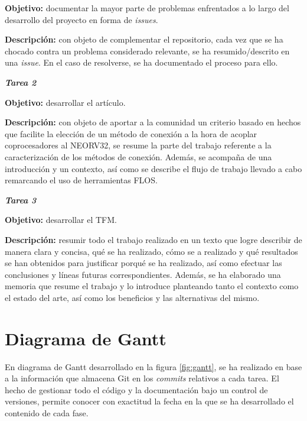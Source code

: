 \textbf{Objetivo:} documentar la mayor parte de problemas enfrentados a lo largo del desarrollo del proyecto en forma de \textit{issues}.

\textbf{Descripción:} con objeto de complementar el repositorio, cada vez que se ha chocado contra un problema considerado relevante, se ha resumido/descrito en una \textit{issue}.
En el caso de resolverse, se ha documentado el proceso para ello.

\noindent \textbf{\textit{Tarea 2}}

\textbf{Objetivo:} desarrollar el artículo.

\textbf{Descripción:} con objeto de aportar a la comunidad un criterio basado en hechos que facilite la elección de un método de conexión a la hora de acoplar coprocesadores al NEORV32, se resume la parte del trabajo referente a la caracterización de los métodos de conexión. 
Además, se acompaña de una introducción y un contexto, así como se describe el flujo de trabajo llevado a cabo remarcando el uso de herramientas FLOS.

\noindent \textbf{\textit{Tarea 3}}

\textbf{Objetivo:} desarrollar el TFM.

\textbf{Descripción:} resumir todo el trabajo realizado en un texto que logre describir de manera clara y concisa, qué se ha realizado, cómo se a realizado y qué resultados se han obtenidos para justificar porqué se ha realizado, así como efectuar las conclusiones y líneas futuras correspondientes.
Además, se ha elaborado una memoria que resume el trabajo y lo introduce planteando tanto el contexto como el estado del arte, así como los beneficios y las alternativas del mismo.

\section{Diagrama de Gantt}

En diagrama de Gantt desarrollado en la figura \ref{fig:gantt}, se ha realizado en base a la información que almacena Git en los \textit{commits} relativos a cada tarea.
El hecho de gestionar todo el código y la documentación bajo un control de versiones, permite conocer con exactitud la fecha en la que se ha desarrollado el contenido de cada fase.


